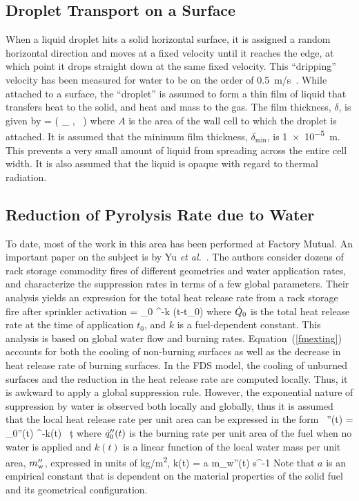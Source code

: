 \subsection{Droplet Transport on a Surface}

When a liquid droplet hits a solid horizontal surface, it is assigned a
random horizontal direction and moves at a fixed velocity until it
reaches the edge, at which point it drops straight down at the same
fixed velocity. This ``dripping'' velocity has been measured for water to be on
the order of 0.5~m/s~\cite{Hamins:1,Hamins:IAFSS2002}.
While attached to a surface, the ``droplet'' is assumed to form a thin film of liquid that
transfers heat to the solid, and heat and mass to
the gas. The film thickness, $\delta$, is given by
\be
   \delta = \max \left( \delta_{\min} , \sum {} \,  \right)
\ee
where $A$ is the area of the wall cell to which the droplet is attached. It is assumed that the minimum film thickness, $\delta_{\min}$, is \SI{1e-5}{m}. This prevents a very small amount of liquid from spreading across the entire cell width. It is also assumed that the liquid is opaque with regard to thermal radiation.

\subsection{Reduction of Pyrolysis Rate due to Water}

To date, most of the work in this area has been performed at Factory Mutual. An important paper on the subject is by Yu {\em et al.}~\cite{Yu:1}. The authors consider dozens of rack storage commodity fires of different geometries and water application rates, and characterize the suppression rates in terms of a few global parameters. Their analysis yields an expression for the total heat release rate from a rack storage fire after sprinkler activation
\be
   \dQ = \dQ_0 \; ^{-k (t-t_0)}  \label{fmexting}
\ee
where $\dot{Q}_0$ is the total heat release rate at the time of application $t_0$, and $k$ is a fuel-dependent constant. This analysis is based on global water flow and burning rates. Equation~(\ref{fmexting}) accounts for both the cooling of non-burning surfaces as well as the decrease in heat release rate of burning surfaces. In the FDS model, the cooling of unburned surfaces and the reduction in the heat release rate are computed locally. Thus, it is awkward to apply a global suppression rule. However, the exponential nature of suppression by water is observed both locally and globally, thus it is assumed that the local heat release rate per unit area can be expressed in the form~\cite{Hamins:1,Hamins:IAFSS2002}
\be
   \dq''(t) = \dq_0''(t) \; ^{-\int k(t) \, \d t}
\label{nistexting} \ee
where $\dot{q}_0''(t)$ is the burning rate per unit area of the fuel when no water is applied and $k(t)$ is a linear function of the local water mass per unit area, $m_{\rm w}''$, expressed in units of \si{kg/m^2},
\be
   k(t) = a \; m_{\rm w}''(t) \quad   \hbox{s}^{-1}
\ee
Note that $a$ is an empirical constant that is dependent on the material properties of the solid fuel and its geometrical configuration.




